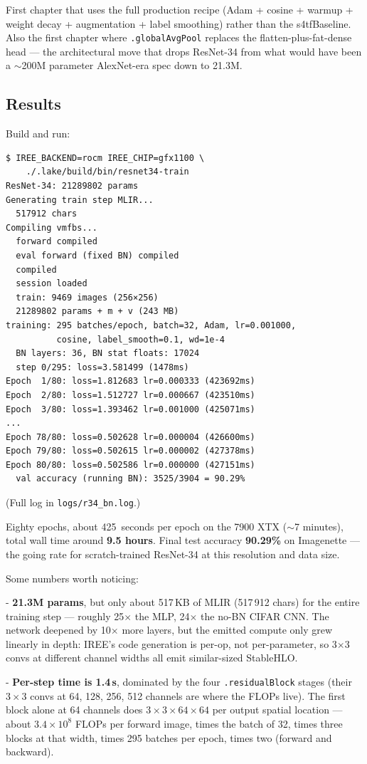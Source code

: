 First chapter that uses the full production recipe (Adam + cosine
+ warmup + weight decay + augmentation + label smoothing) rather
than the s4tfBaseline. Also the first chapter where
\texttt{.globalAvgPool} replaces the flatten-plus-fat-dense head --- the
architectural move that drops ResNet-34 from what would have been a
$\sim$200M parameter AlexNet-era spec down to 21.3M.

\subsection*{Results}

Build and run:

\begin{verbatim}
$ IREE_BACKEND=rocm IREE_CHIP=gfx1100 \
    ./.lake/build/bin/resnet34-train
ResNet-34: 21289802 params
Generating train step MLIR...
  517912 chars
Compiling vmfbs...
  forward compiled
  eval forward (fixed BN) compiled
  compiled
  session loaded
  train: 9469 images (256×256)
  21289802 params + m + v (243 MB)
training: 295 batches/epoch, batch=32, Adam, lr=0.001000,
          cosine, label_smooth=0.1, wd=1e-4
  BN layers: 36, BN stat floats: 17024
  step 0/295: loss=3.581499 (1478ms)
Epoch  1/80: loss=1.812683 lr=0.000333 (423692ms)
Epoch  2/80: loss=1.512727 lr=0.000667 (423510ms)
Epoch  3/80: loss=1.393462 lr=0.001000 (425071ms)
...
Epoch 78/80: loss=0.502628 lr=0.000004 (426600ms)
Epoch 79/80: loss=0.502615 lr=0.000002 (427378ms)
Epoch 80/80: loss=0.502586 lr=0.000000 (427151ms)
  val accuracy (running BN): 3525/3904 = 90.29%
\end{verbatim}

(Full log in \texttt{logs/r34\_bn.log}.)

Eighty epochs, about 425~seconds per epoch on the 7900 XTX ($\sim$7
minutes), total wall time around \textbf{9.5 hours}. Final test
accuracy \textbf{90.29\%} on Imagenette --- the going rate for
scratch-trained ResNet-34 at this resolution and data size.

Some numbers worth noticing:

- \textbf{21.3M params}, but only about 517\,KB of MLIR
  (517\,912 chars) for the entire training step --- roughly
  25$\times$ the MLP, 24$\times$ the no-BN CIFAR CNN. The network
  deepened by 10$\times$ more layers, but the emitted compute only
  grew linearly in depth: IREE's code generation is per-op, not
  per-parameter, so 3$\times$3 convs at different channel widths
  all emit similar-sized StableHLO.

- \textbf{Per-step time is 1.4\,s}, dominated by the four
  \texttt{.residualBlock} stages (their $3 \times 3$ convs at 64,
  128, 256, 512 channels are where the FLOPs live). The first
  block alone at 64 channels does $3 \times 3 \times 64 \times 64$
  per output spatial location --- about $3.4 \times 10^8$ FLOPs per
  forward image, times the batch of 32, times three blocks at that
  width, times 295 batches per epoch, times two (forward and
  backward).

